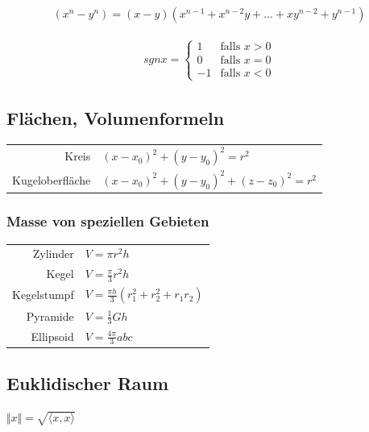 \documentclass[a4paper]{article}
\begin{document}
\begin{appendix}
\begin{fmerke}
	\end{fmerke}

	\begin{fmerke}
		\begin{align*}
			(x^n - y^n) = (x-y)(x^{n-1}+x^{n-2}y + \ldots + x y^{n-2}+y^{n-1})
		\end{align*}

		\end{fmerke}
		
	\begin{fdef}
		\begin{align*}
			sgn{x} = \begin{cases}
							1	& \text{falls }	x > 0 \\
							0	& \text{falls }	x = 0 \\
							-1	& \text{falls }	x < 0\end{cases}
		\end{align*}
	\end{fdef}
	
	\subsection{Flächen, Volumenformeln}
		\begin{tabular}{rl}
			Kreis &$(x-x_0)^2 + (y-y_0)^2 = r^2$\\
			Kugeloberfläche &$(x-x_0)^2 + (y-y_0)^2 + (z-z_0)^2 = r^2$
		\end{tabular}
		
		\subsubsection{Masse von speziellen Gebieten}
			
			\begin{tabular}{rl}
				Zylinder	&$V=\pi r^2 h$\\
				Kegel		&$V= \frac{\pi}{3}r^2 h$\\
				Kegelstumpf	&$V= \frac{\pi h}{3}(r_1^2 + r_2^2 + r_1 r_2)$\\
				Pyramide	&$V= \frac{1}{3}Gh$\\
				Ellipsoid	&$V= \frac{4\pi}{3} abc$
			\end{tabular}	

		
		\subsection{Euklidischer Raum}
			\begin{fmerke}
				$\Vert x \Vert = \sqrt{\langle x,x \rangle}$
			\end{fmerke}
		

\end{appendix}
\end{document}
